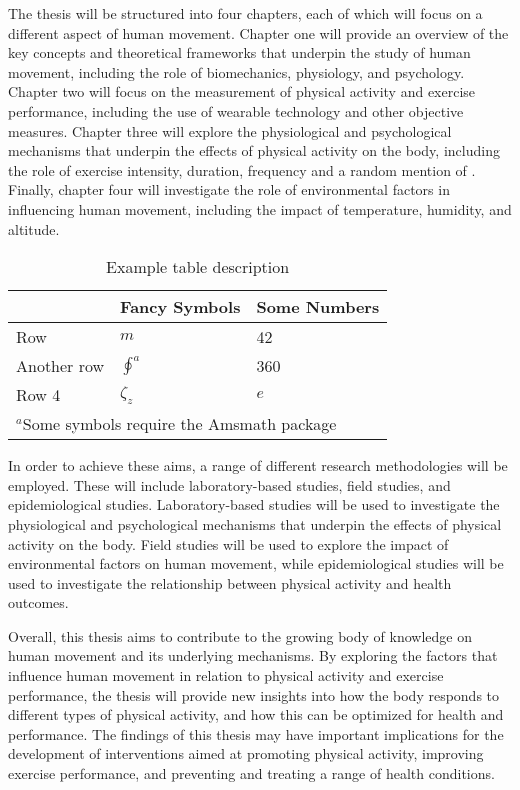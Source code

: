 The thesis will be structured into four chapters, each of which will focus on a different aspect of human movement. Chapter one will provide an overview of the key concepts and theoretical frameworks that underpin the study of human movement, including the role of biomechanics, physiology, and psychology. Chapter two will focus on the measurement of physical activity and exercise performance, including the use of wearable technology and other objective measures. Chapter three will explore the physiological and psychological mechanisms that underpin the effects of physical activity on the body, including the role of exercise intensity, duration, frequency and a random mention of . Finally, chapter four will investigate the role of environmental factors in influencing human movement, including the impact of temperature, humidity, and altitude.

\begin{table}[htp]
	\centering {}
	\caption[Example Title]{Example table description}
	\begin{tabular}{@{}lll@{}} 
		\toprule
									& Fancy Symbols				& Some Numbers \\ 
		\midrule
		Row							& $m$						& 42\\
		Another row					& $\oint^a$ 				& 360 \\
		Row 4						& ${\zeta_z}$				& $e$ \\
		\bottomrule
		\multicolumn{3}{l}{\footnotesize{$^a$Some symbols require the Amsmath package}}
	\end{tabular}
	\label{tab:example}
\end{table}

In order to achieve these aims, a range of different research methodologies will be employed. These will include laboratory-based studies, field studies, and epidemiological studies. Laboratory-based studies will be used to investigate the physiological and psychological mechanisms that underpin the effects of physical activity on the body. Field studies will be used to explore the impact of environmental factors on human movement, while epidemiological studies will be used to investigate the relationship between physical activity and health outcomes.

Overall, this thesis aims to contribute to the growing body of knowledge on human movement and its underlying mechanisms. By exploring the factors that influence human movement in relation to physical activity and exercise performance, the thesis will provide new insights into how the body responds to different types of physical activity, and how this can be optimized for health and performance. The findings of this thesis may have important implications for the development of interventions aimed at promoting physical activity, improving exercise performance, and preventing and treating a range of health conditions.

